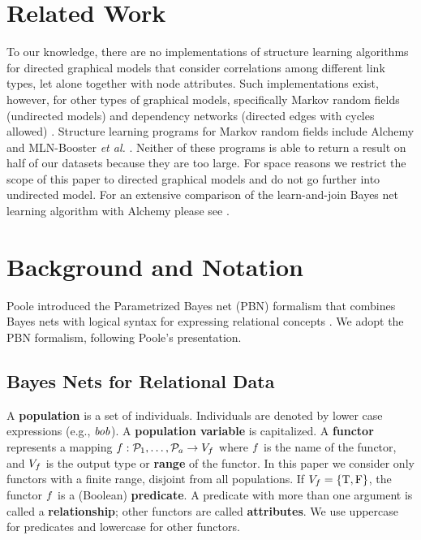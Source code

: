 \documentclass{article}
\begin{document}
\section{Related Work} 
To our knowledge, there are no implementations of structure learning algorithms for directed graphical models that consider correlations among different link types, let alone together with node attributes. Such implementations exist, however, for other types of graphical models, specifically Markov random fields (undirected models) \cite{Domingos2009} and dependency networks (directed edges with cycles allowed) \cite{Natarajan2012}. Structure learning programs for Markov random fields include Alchemy \cite{Domingos2009} and MLN-Booster {\em et al.} \cite{Khot2013}. 
Neither of these programs is able to return a result on half of our datasets because they are too large. For space reasons we restrict the scope of this paper to directed graphical models and do not go further into undirected model. For an extensive comparison of the learn-and-join Bayes net learning algorithm with Alchemy please see \cite{Schulte2012}.

\section{Background and Notation} 
Poole introduced the Parametrized Bayes net (PBN) formalism that combines Bayes nets with logical syntax for expressing relational concepts \cite{Poole2003}. We adopt the PBN formalism, following Poole's presentation.


\subsection{Bayes Nets for Relational Data}
A \textbf{population} is a set of individuals. Individuals are denoted by lower case expressions (e.g., $\it{bob}$). A \textbf{population variable} is capitalized. A \textbf{functor} represents a mapping
$
f: \mathcal{P}_{1},\ldots,\mathcal{P}_{a} \rightarrow V_{f}
$
where $f$ is the name of the functor,  and $V_{f}$ is the output type or \textbf{range} of the functor. In this paper we consider only functors with a finite range, disjoint from all populations.  If $V_{f} = \{\mathrm{T},\mathrm{F}\}$, the functor $f$ is a (Boolean) \textbf{predicate}. A predicate with more than one argument is called a \textbf{relationship}; other functors are called \textbf{attributes}. We use uppercase for predicates and lowercase for other functors.
\end{document}
